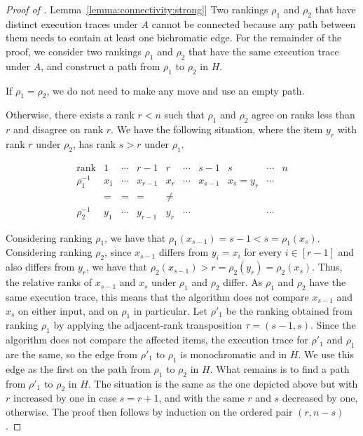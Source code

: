 \documentclass[11pt]{article}
\numberwithin{equation}{section}
\theoremstyle{definition}
\theoremstyle{plain}
\newcommand{\expref}[2]{\hyperref[#2]{#1~\ref{#2}}}
\newcommand{\ranking}{\rho}
\newcommand{\transposition}{\tau}
\begin{document}
\begin{proof}[Proof of \expref{Lemma}{lemma:connectivity:strong}]
Two rankings $\ranking_1$ and $\ranking_2$ that have distinct execution traces under $A$ cannot be connected because any path between them needs to contain at least one bichromatic edge. For the remainder of the proof, we consider two rankings $\ranking_1$ and $\ranking_2$ that have the same execution trace under $A$, and construct a path from $\ranking_1$ to $\ranking_2$ in $H$.

If $\ranking_1 = \ranking_2$, we do not need to make any move and use an empty path. 

Otherwise, there exists a rank $r<n$ such that $\ranking_1$ and $\ranking_2$ agree on ranks less than $r$ and disagree on rank $r$. We have the following situation, where the item $y_r$ with rank $r$ under $\ranking_2$, has rank $s>r$ under $\ranking_1$. 

\begin{equation*}
    \begin{array}{r|ccccccccc}
      \text{rank} & 1 & \cdots &  r-1 &   r & \cdots & s-1 & s & \cdots &   n \\
      \hline
      \ranking_1^{-1} & x_1 & \cdots & x_{r-1} &   x_r  & \cdots & x_{s-1} & x_s = y_r & \cdots &     \\
       & {\scriptstyle =}  & {\scriptstyle =}  & {\scriptstyle =}  &  {\scriptstyle \ne}  &    &    &  &   &    \\
      \ranking_2^{-1} & y_1 & \cdots & y_{r-1} & y_r & \cdots &     &     & \cdots &    
    \end{array}
\end{equation*}

Considering ranking $\ranking_1$, we have that $\ranking_1(x_{s-1}) = s-1 < s = \ranking_1(x_s)$. Considering ranking $\ranking_2$, since $x_{s-1}$ differs from $y_i=x_i$ for every $i \in [r-1]$ and also differs from $y_r$, we have that $\ranking_2(x_{s-1}) > r = \ranking_2(y_r) = \ranking_2(x_s)$. Thus, the relative ranks of $x_{s-1}$ and $x_s$ under $\ranking_1$ and $\ranking_2$ differ. As $\ranking_1$ and $\ranking_2$ have the same execution trace, this means that the algorithm does not compare $x_{s-1}$ and $x_s$ on either input, and on $\ranking_1$ in particular. Let $\ranking'_1$ be the ranking obtained from ranking $\ranking_1$ by applying the adjacent-rank transposition $\transposition = (s-1,s)$. Since the algorithm does not compare the affected items, the execution trace for $\ranking'_1$ and $\ranking_1$ are the same, so the edge from $\ranking'_1$ to $\ranking_1$ is monochromatic and in $H$. We use this edge as the first on the path from $\ranking_1$ to $\ranking_2$ in $H$. What remains is to find a path from $\ranking'_1$ to $\ranking_2$ in $H$. The situation is the same as the one depicted above but with $r$ increased by one in case $s=r+1$, and with the same $r$ and $s$ decreased by one, otherwise. The proof then follows by induction on the ordered pair $(r,n-s)$. 
\end{proof}
\end{document}
